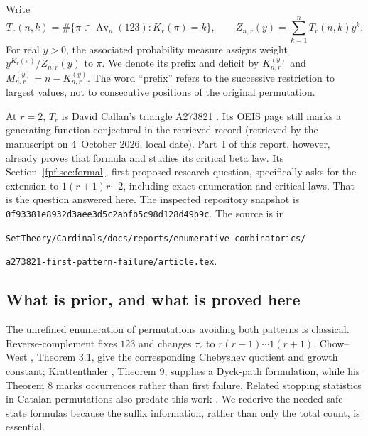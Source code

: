 \documentclass[11pt]{article}
\numberwithin{equation}{section}
\theoremstyle{definition}
\newcommand{\Av}{\operatorname{Av}}
\newcommand{\lprepo}{\texttt{0f93381e8932d3aee3d5c2abfb5c98d128d49b9c}}
\begin{document}
Write
\begin{equation}\label{fpf:lp:eq:counts}
 T_r(n,k)=\#\{\pi\in\Av_n(123):K_r(\pi)=k\},\qquad
 Z_{n,r}(y)=\sum_{k=1}^n T_r(n,k)y^k.
\end{equation}
For real \(y>0\), the associated probability measure assigns weight
\(y^{K_r(\pi)}/Z_{n,r}(y)\) to \(\pi\). We denote its prefix and deficit
by \(K_{n,r}^{(y)}\) and \(M_{n,r}^{(y)}=n-K_{n,r}^{(y)}\).
The word ``prefix'' refers to the successive restriction to largest
values, not to consecutive positions of the original permutation.

At \(r=2\), \(T_r\) is David Callan's triangle A273821
\cite{oeis273821}. Its OEIS page still marks a generating function
conjectural in the retrieved record (retrieved by the manuscript on
4~October 2026, local date). Part~I of this report, however, already
proves that formula and studies its critical beta law. Its
Section~\ref{fpf:sec:formal}, first proposed research question,
specifically asks for the extension to \(1(r+1)r\cdots2\), including exact
enumeration and critical laws. That is the question answered here. The
inspected repository snapshot is \lprepo. The source is in
\begin{center}\small
\nolinkurl{SetTheory/Cardinals/docs/reports/enumerative-combinatorics/}\par
\nolinkurl{a273821-first-pattern-failure/article.tex}.
\end{center}

\subsection{What is prior, and what is proved here}

The unrefined enumeration of permutations avoiding both patterns is
classical. Reverse-complement fixes \(123\) and changes \(\tau_r\) to
\(r(r-1)\cdots1(r+1)\). Chow--West \cite{fpf-lp-cw}, Theorem 3.1, give the
corresponding Chebyshev quotient and growth constant; Krattenthaler
\cite{fpf-lp-kratt}, Theorem 9, supplies a Dyck-path formulation, while his
Theorem 8 marks occurrences rather than first failure. Related stopping
statistics in Catalan permutations also predate this work
\cite{fpf-lp-firstascent}. We rederive the needed safe-state formulas
because the suffix information, rather than only the total count, is
essential.
\end{document}
